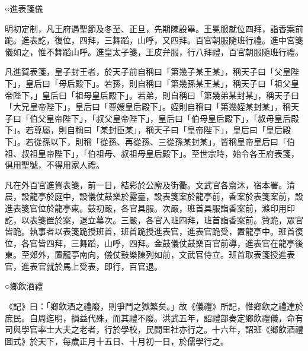 ○進表箋儀

明初定制，凡王府遇聖節及冬至、正旦，先期陳設畢。王冕服就位四拜，詣香案前跪。進表訖，復位，四拜，三舞蹈，山呼，又四拜。百官朝服隨班行禮。進中宮箋儀如之，惟不舞蹈山呼。進皇太子箋，王皮弁服，行八拜禮，百官朝服隨班行禮。

凡進賀表箋，皇子封王者，於天子前自稱曰「第幾子某王某」，稱天子曰「父皇陛下」，皇后曰「母后殿下」。若孫，則自稱曰「第幾孫某王某」，稱天子曰「祖父皇帝陛下，」皇后曰「祖母皇后殿下」。若弟，則自稱曰「第幾弟某封某」，稱天子曰「大兄皇帝陛下」，皇后曰「尊嫂皇后殿下」。姪則自稱曰「第幾姪某封某」，稱天子曰「伯父皇帝陛下」，「叔父皇帝陛下」，皇后曰「伯母皇后殿下」，「叔母皇后殿下」。若尊屬，則自稱曰「某封臣某」，稱天子曰「皇帝陛下」，皇后曰「皇后殿下」。若從孫以下，則稱「從孫、再從孫、三從孫某封某」，皆稱皇帝皇后曰「伯祖、叔祖皇帝陛下」，「伯祖母、叔祖母皇后殿下」。至世宗時，始令各王府表箋，俱用聖號，不得用家人禮。

凡在外百官進賀表箋，前一日，結彩於公廨及街衢。文武官各齋沐，宿本署。清晨，設龍亭於庭中，設儀仗鼓樂於露臺，設表箋案於龍亭前，香案於表箋案前，設進表箋官位於龍亭東。鼓初嚴，各官具服。次嚴，班首具服詣香案前，滌印用印訖，以表箋置於案，退立幕次。三嚴，各官入班四拜，班首詣香案前。贊跪，眾官皆跪。執事者以表箋跪授班首，班首跪授進表官，進表官跪受，置龍亭中。班首復位，各官皆四拜，三舞蹈，山呼，四拜。金鼓儀仗鼓樂百官前導，進表官在龍亭後東。至郊外，置龍亭南向，儀仗鼓樂陳列如前，文武官侍立。班首取表箋授進表官，進表官就於馬上受表，即行，百官退。

○鄉飲酒禮

《記》曰：「鄉飲酒之禮廢，則爭鬥之獄繁矣。」故《儀禮》所記，惟鄉飲之禮達於庶民。自周迄明，損益代殊，而其禮不廢。洪武五年，詔禮部奏定鄉飲禮儀，命有司與學官率士大夫之老者，行於學校，民間里社亦行之。十六年，詔班《鄉飲酒禮圖式》於天下，每歲正月十五日、十月初一日，於儒學行之。


